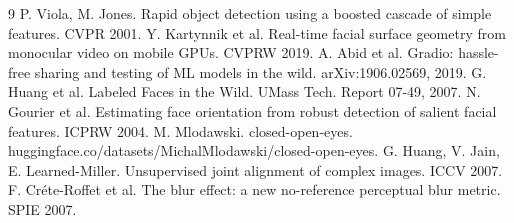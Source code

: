 \documentclass[11pt]{article}
\begin{document}
{\footnotesize
\begin{thebibliography}{9}
\setlength{\itemsep}{0pt}
 P. Viola, M. Jones. Rapid object detection using a boosted cascade of simple features. CVPR 2001.
 Y. Kartynnik et al. Real-time facial surface geometry from monocular video on mobile GPUs. CVPRW 2019.
 A. Abid et al. Gradio: hassle-free sharing and testing of ML models in the wild. arXiv:1906.02569, 2019.
 G. Huang et al. Labeled Faces in the Wild. UMass Tech. Report 07-49, 2007.
 N. Gourier et al. Estimating face orientation from robust detection of salient facial features. ICPRW 2004.
 M. Mlodawski. closed-open-eyes. huggingface.co/datasets/MichalMlodawski/closed-open-eyes.
 G. Huang, V. Jain, E. Learned-Miller. Unsupervised joint alignment of complex images. ICCV 2007.
 F. Cr\'ete-Roffet et al. The blur effect: a new no-reference perceptual blur metric. SPIE 2007.
\end{thebibliography}}
\end{document}
